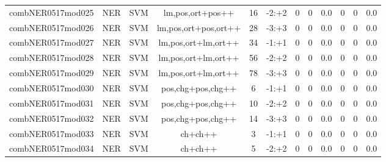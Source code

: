 \documentclass[a4paper]{article}
\begin{document}
\begin{landscape}
\begin{center}
\begin{tabular}{ |c|c|c|c|c|c|c|c|c|c|c|c|}
 
 	
 	\small{ combNER0517mod025 } & \small{ NER} & \small{  SVM }  & lm,pos,ort+pos++  &  16 &  \small{  -2:+2 }  &  0 & 0 & 0.0  &  0 & 0 & 0.0 \\
 	

 
 	
 	\small{ combNER0517mod026 } & \small{ NER} & \small{  SVM }  & lm,pos,ort+pos,ort++  &  28 &  \small{  -3:+3 }  &  0 & 0 & 0.0  &  0 & 0 & 0.0 \\
 	

 
 	
 	\small{ combNER0517mod027 } & \small{ NER} & \small{  SVM }  & lm,pos,ort+lm,ort++  &  34 &  \small{  -1:+1 }  &  0 & 0 & 0.0  &  0 & 0 & 0.0 \\
 	

 
 	
 	\small{ combNER0517mod028 } & \small{ NER} & \small{  SVM }  & lm,pos,ort+lm,ort++  &  56 &  \small{  -2:+2 }  &  0 & 0 & 0.0  &  0 & 0 & 0.0 \\
 	

 
 	
 	\small{ combNER0517mod029 } & \small{ NER} & \small{  SVM }  & lm,pos,ort+lm,ort++  &  78 &  \small{  -3:+3 }  &  0 & 0 & 0.0  &  0 & 0 & 0.0 \\
 	

 
 	
 	\small{ combNER0517mod030 } & \small{ NER} & \small{  SVM }  & pos,chg+pos,chg++  &  6 &  \small{  -1:+1 }  &  0 & 0 & 0.0  &  0 & 0 & 0.0 \\
 	

 
 	
 	\small{ combNER0517mod031 } & \small{ NER} & \small{  SVM }  & pos,chg+pos,chg++  &  10 &  \small{  -2:+2 }  &  0 & 0 & 0.0  &  0 & 0 & 0.0 \\
 	

 
 	
 	\small{ combNER0517mod032 } & \small{ NER} & \small{  SVM }  & pos,chg+pos,chg++  &  14 &  \small{  -3:+3 }  &  0 & 0 & 0.0  &  0 & 0 & 0.0 \\
 	

 
 	
 	\small{ combNER0517mod033 } & \small{ NER} & \small{  SVM }  & ch+ch++  &  3 &  \small{  -1:+1 }  &  0 & 0 & 0.0  &  0 & 0 & 0.0 \\
 	

 
 	
 	\small{ combNER0517mod034 } & \small{ NER} & \small{  SVM }  & ch+ch++  &  5 &  \small{  -2:+2 }  &  0 & 0 & 0.0  &  0 & 0 & 0.0 \\
 	


\end{tabular}
\end{center}
\end{landscape}
\end{document}
